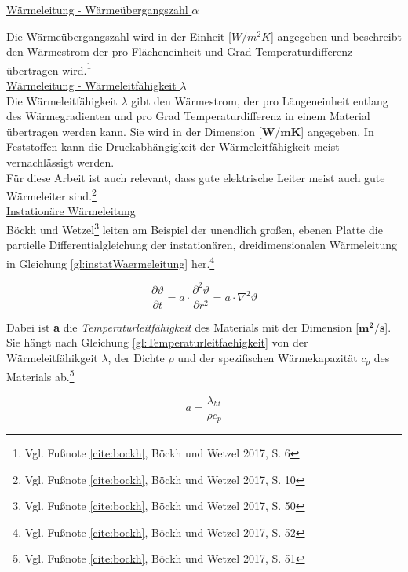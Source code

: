 \underline{Wärmeleitung - Wärmeübergangszahl $\alpha$}

Die Wärmeübergangszahl wird in der Einheit [$W/m^{2}K$] angegeben und beschreibt den Wärmestrom der pro Flächeneinheit und Grad Temperaturdifferenz übertragen wird.\footnote{Vgl. Fußnote \ref{cite:bockh}, Böckh und Wetzel 2017, S. 6}\\

\underline{Wärmeleitung - Wärmeleitfähigkeit $\lambda$}
\\

Die Wärmeleitfähigkeit $\lambda$ gibt den Wärmestrom, der pro Längeneinheit entlang des Wärmegradienten und pro Grad Temperaturdifferenz in einem Material übertragen werden kann. Sie wird in der Dimension [$\mathbf{W/mK}$] angegeben. In Feststoffen kann die Druckabhängigkeit der Wärmeleitfähigkeit meist vernachlässigt werden. \\
Für diese Arbeit ist auch relevant, dass gute elektrische Leiter meist auch gute Wärmeleiter sind.\footnote{Vgl. Fußnote \ref{cite:bockh}, Böckh und Wetzel 2017, S. 10} \\

\underline{Instationäre Wärmeleitung}
\\

Böckh und Wetzel\footnote{Vgl. Fußnote \ref{cite:bockh}, Böckh und Wetzel 2017, S. 50} leiten am Beispiel der unendlich großen, ebenen Platte die partielle Differentialgleichung der instationären, dreidimensionalen Wärmeleitung in Gleichung \ref{gl:instatWaermeleitung} her.\footnote{Vgl. Fußnote \ref{cite:bockh}, Böckh und Wetzel 2017, S. 52}

\begin{equation}
	\frac{\partial \vartheta}{\partial t} = a \cdot \frac{\partial^{2} \vartheta}{\partial r^{2}} = a \cdot \nabla^{2} \vartheta \label{gl:instatWaermeleitung}
\end{equation}

Dabei ist \textbf{a} die \textit{Temperaturleitfähigkeit} des Materials mit der Dimension [$\mathbf{m^{2}/s}$]. Sie hängt nach Gleichung \ref{gl:Temperaturleitfaehigkeit} von der Wärmeleitfähikgeit $\lambda$, der Dichte $\rho$ und der spezifischen Wärmekapazität $c_{p}$ des Materials ab.\footnote{Vgl. Fußnote \ref{cite:bockh}, Böckh und Wetzel 2017, S. 51}

\begin{equation}
	a = \frac{\lambda_{ht}}{\rho c_{p}} \label{gl:Temperaturleitfaehigkeit}
\end{equation}

